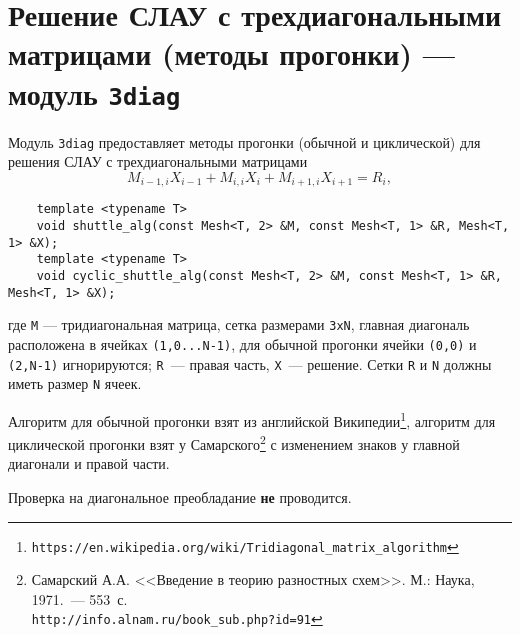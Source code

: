 \section{Решение СЛАУ с трехдиагональными матрицами (методы прогонки) --- модуль {\tt 3diag}}
Модуль \verb'3diag' предоставляет методы прогонки (обычной и циклической) для решения СЛАУ с трехдиагональными матрицами
$$
M_{i-1,i}X_{i-1}+M_{i,i}X_{i}+M_{i+1,i}X_{i+1} = R_i,
$$
\begin{verbatim}
    template <typename T>
    void shuttle_alg(const Mesh<T, 2> &M, const Mesh<T, 1> &R, Mesh<T, 1> &X);
    template <typename T>
    void cyclic_shuttle_alg(const Mesh<T, 2> &M, const Mesh<T, 1> &R, Mesh<T, 1> &X);
\end{verbatim}
где \verb'M' --- тридиагональная матрица, сетка размерами \verb'3хN', главная диагональ расположена в ячейках \verb'(1,0...N-1)',
для обычной прогонки ячейки \verb'(0,0)' и \verb'(2,N-1)' игнорируются;
\verb'R'~--- правая часть, \verb'X'~--- решение. Сетки \verb'R' и \verb'N' должны иметь размер \verb'N' ячеек.

Алгоритм для обычной прогонки взят из английской Википедии\footnote{{\tt https://en.wikipedia.org/wiki/Tridiagonal\_matrix\_algorithm}},
алгоритм для циклической прогонки взят у Самарского\footnote{Самарский А.А. <<Введение в теорию разностных схем>>. М.: Наука, 1971.~--- 553~с.\\
{\tt http://info.alnam.ru/book\_sub.php?id=91}} с изменением знаков у главной диагонали и правой части.

Проверка на диагональное преобладание {\bf не} проводится.
